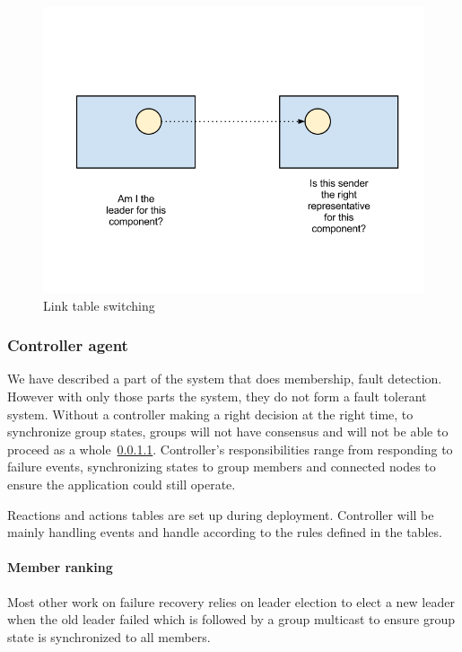 \begin{figure}[h!]
\label{link-table-switch}
\caption{Link table switching}
\centering
    \includegraphics[width=\linewidth]{figures/link-table-switch}
\end{figure}


\subsubsection{Controller agent}

We have described a part of the system that does membership, fault detection.
However with only those parts the system, they do not form a fault tolerant
system. Without a controller making a right decision at the right time,
to synchronize group states, groups will not have consensus and will not be
able to proceed as a whole~\ref{}. Controller’s responsibilities range from
responding to
failure events, synchronizing states to group members and connected nodes to 
ensure the application could still operate.

Reactions and actions tables are set up during deployment. Controller will be
mainly handling events and handle according to the rules defined in the
tables.

\paragraph{Member ranking}

Most other work on failure recovery relies on leader election to elect a new
leader when the old leader failed which is followed by a group multicast to
ensure group state is synchronized to all members.

